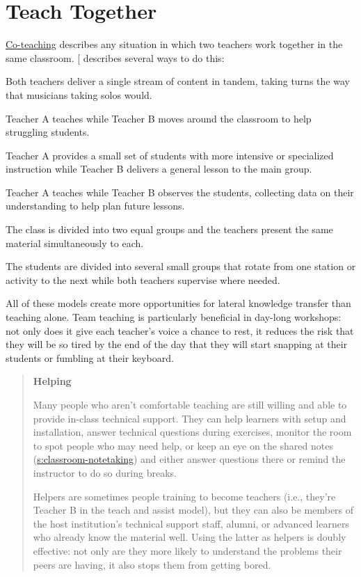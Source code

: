 \section{Teach Together}\label{s:classroom-together}

\protect\hyperlink{g:co-teaching}{Co-teaching} describes any situation in
which two teachers work together in the same classroom.
{[}\protect[\hyperlink{b:Frie2016}{Frie2016}]{]} describes several ways to do this:

\begin{description}
\tightlist
\item[Team teaching:]
Both teachers deliver a single stream of content in tandem, taking
turns the way that musicians taking solos would.
\item[Teach and assist:]
Teacher A teaches while Teacher B moves around the classroom to help
struggling students.
\item[Alternative teaching:]
Teacher A provides a small set of students with more intensive or
specialized instruction while Teacher B delivers a general lesson to
the main group.
\item[Teach and observe:]
Teacher A teaches while Teacher B observes the students, collecting
data on their understanding to help plan future lessons.
\item[Parallel teaching:]
The class is divided into two equal groups and the teachers present
the same material simultaneously to each.
\item[Station teaching:]
The students are divided into several small groups that rotate from
one station or activity to the next while both teachers supervise
where needed.
\end{description}

All of these models create more opportunities for lateral knowledge
transfer than teaching alone. Team teaching is particularly beneficial
in day-long workshops: not only does it give each teacher's voice a
chance to rest, it reduces the risk that they will be so tired by the
end of the day that they will start snapping at their students or
fumbling at their keyboard.

\begin{quote}\setlength{\parindent}{0pt}
\textbf{Helping}

Many people who aren't comfortable teaching are still willing and able
to provide in-class technical support. They can help learners with
setup and installation, answer technical questions during exercises,
monitor the room to spot people who may need help, or keep an eye on
the shared notes (\protect\hyperlink{SECTION}{s:classroom-notetaking}) and either
answer questions there or remind the instructor to do so during
breaks.

Helpers are sometimes people training to become teachers (i.e.,
they're Teacher B in the teach and assist model), but they can also
be members of the host institution's technical support staff, alumni,
or advanced learners who already know the material well. Using the
latter as helpers is doubly effective: not only are they more likely
to understand the problems their peers are having, it also stops them
from getting bored.
\end{quote}

